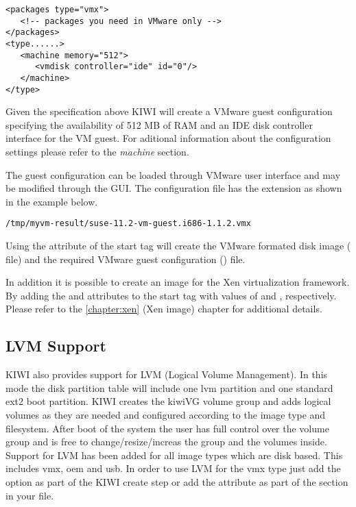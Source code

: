 \begin{Command}{13cm}
\begin{verbatim}
<packages type="vmx">
   <!-- packages you need in VMware only -->
</packages>
<type......>
   <machine memory="512">
      <vmdisk controller="ide" id="0"/>
   </machine>
</type>
\end{verbatim}
\end{Command}

Given the specification above KIWI will create a VMware guest
configuration specifying the availability of 512 MB of RAM and an IDE 
disk controller interface for the VM guest. For aditional information
about the configuration settings please refer to the 
\textit{machine} section. 

The guest configuration can be loaded through VMware user interface and 
may be modified through the GUI. The configuration file has the  
extension as shown in the example below.

\begin{Command}{13cm}
\begin{verbatim}
/tmp/myvm-result/suse-11.2-vm-guest.i686-1.1.2.vmx
\end{verbatim}
\end{Command}

Using the  attribute of the  start tag
will create the VMware formated disk image ( file) and the required 
VMware guest configuration () file.

In addition it is possible to create an image for the Xen virtualization 
framework.  By adding the  and  
attributes to the  start tag with values of  and
, 
respectively. Please refer to the \ref{chapter:xen} (Xen image) chapter 
for additional details.

\subsection{LVM Support}
KIWI also provides support for LVM (Logical Volume Management). In this
mode the disk partition table will include one lvm partition and one
standard ext2 boot partition. KIWI creates the kiwiVG volume group and
adds logical volumes as they are needed and configured according to the
image type and filesystem. After boot of the system the user has full
control over the volume group and is free to change/resize/increas the
group and the volumes inside. Support for LVM has been added for all
image types which are disk based. This includes vmx, oem and usb.
In order to use LVM for the vmx type just add the  option
as part of the KIWI create step or add the attribute 
as part of the  section in your  file.

